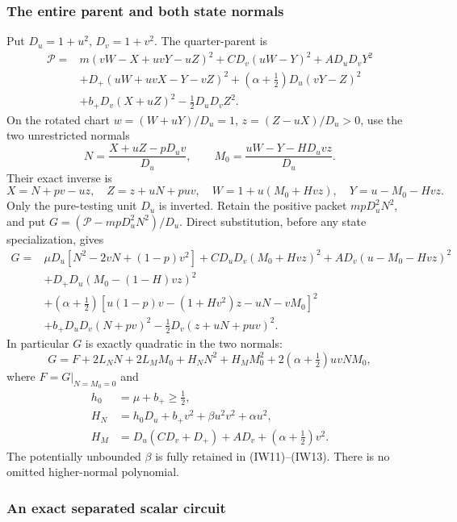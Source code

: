 \subsubsection*{The entire parent and both state normals}

Put $D_u=1+u^2$, $D_v=1+v^2$. The quarter-parent is
\[
\begin{split}
 \mathcal P={}&m(vW-X+uvY-uZ)^2+CD_v(uW-Y)^2+AD_uD_vY^2\\
 &+D_+(uW+uvX-Y-vZ)^2
 +(\alpha+\tfrac12)D_u(vY-Z)^2\\
 &+b_+D_v(X+uZ)^2-\tfrac12D_uD_vZ^2.
\end{split}                                                     \tag{IW9}
\]
On the rotated chart
$w=(W+uY)/D_u=1$, $z=(Z-uX)/D_u>0$, use the two unrestricted normals
\[
 N=\frac{X+uZ-pD_uv}{D_u},\qquad
 M_0=\frac{uW-Y-HD_uvz}{D_u}.
\]
Their exact inverse is
\[
 X=N+pv-uz,\quad Z=z+uN+puv,\quad
 W=1+u(M_0+Hvz),\quad Y=u-M_0-Hvz.                     \tag{IW10}
\]
Only the pure-testing unit $D_u$ is inverted. Retain the positive
packet $mpD_u^2N^2$, and put $G=(\mathcal P-mpD_u^2N^2)/D_u$.
Direct substitution, before any state specialization, gives
\[
\begin{split}
 G={}&\mu D_u[N^2-2vN+(1-p)v^2]
      +CD_uD_v(M_0+Hvz)^2+A D_v(u-M_0-Hvz)^2\\
 &+D_+D_u(M_0-(1-H)vz)^2\\
 &+(\alpha+\tfrac12)
       [u(1-p)v-(1+Hv^2)z-uN-vM_0]^2\\
 &+b_+D_uD_v(N+pv)^2-\tfrac12D_v(z+uN+puv)^2.
\end{split}                                                     \tag{IW11}
\]
In particular $G$ is exactly quadratic in the two normals:
\[
 G=F+2L_NN+2L_MM_0+H_NN^2+H_MM_0^2
                         +2(\alpha+\tfrac12)uvNM_0,
                                                               \tag{IW12}
\]
where $F=G|_{N=M_0=0}$ and
\[
\begin{split}
 h_0&=\mu+b_+\geq\tfrac12,\\
 H_N&=h_0D_u+b_+v^2+\beta u^2v^2+\alpha u^2,\\
 H_M&=D_u(CD_v+D_+)+AD_v+(\alpha+\tfrac12)v^2.
\end{split}                                                     \tag{IW13}
\]
The potentially unbounded $\beta$ is fully retained in (IW11)--(IW13).
There is no omitted higher-normal polynomial.

\subsubsection*{An exact separated scalar circuit}

